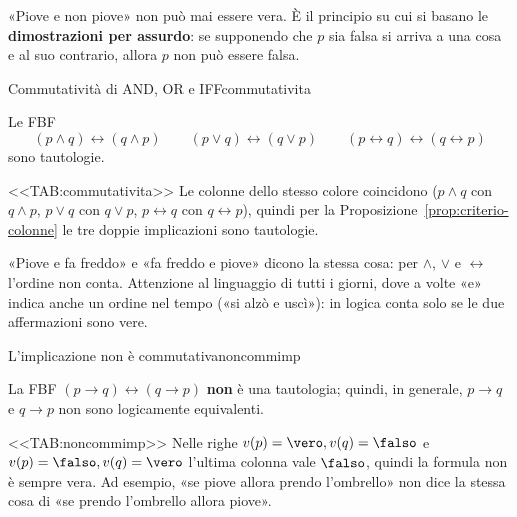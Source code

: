 \begin{spiegazione}
    «Piove e non piove» non può mai essere vera. È il principio su cui si basano le \textbf{dimostrazioni per assurdo}: se supponendo che $p$ sia falsa si
    arriva a una cosa e al suo contrario, allora $p$ non può essere falsa.
\end{spiegazione}


\begin{concetto}
\begin{Proposizione}{Commutatività di AND, OR e IFF}{commutativita}
    \begin{prerequisiti}
    \end{prerequisiti}
    Le FBF
    \[ (p \wedge q) \leftrightarrow (q \wedge p) \qquad (p \vee q) \leftrightarrow (q \vee p) \qquad (p \leftrightarrow q) \leftrightarrow (q \leftrightarrow p) \]
    sono tautologie.
\end{Proposizione}

\begin{dimostrazione}
    <<TAB:commutativita>>
    Le colonne dello stesso colore coincidono ($p \wedge q$ con $q \wedge p$, $p \vee q$ con $q \vee p$,
    $p \leftrightarrow q$ con $q \leftrightarrow p$), quindi per la Proposizione~\ref{prop:criterio-colonne}
    le tre doppie implicazioni sono tautologie.
\end{dimostrazione}
\end{concetto}

\begin{spiegazione}
    «Piove e fa freddo» e «fa freddo e piove» dicono la stessa cosa: per $\wedge$, $\vee$ e $\leftrightarrow$ l'ordine non conta. Attenzione al linguaggio di tutti
    i giorni, dove a volte «e» indica anche un ordine nel tempo («si alzò e uscì»): in logica conta solo se le due affermazioni sono vere.
\end{spiegazione}


\begin{concetto}
\begin{Proposizione}{L'implicazione non è commutativa}{noncommimp}
    \begin{prerequisiti}
    \end{prerequisiti}
    La FBF $(p \rightarrow q) \leftrightarrow (q \rightarrow p)$ \textbf{non} è una tautologia; quindi, in generale,
    $p \rightarrow q$ e $q \rightarrow p$ non sono logicamente equivalenti.
\end{Proposizione}

\begin{dimostrazione}
    <<TAB:noncommimp>>
    Nelle righe $v(p) = \vero, v(q) = \falso$ e $v(p) = \falso, v(q) = \vero$ l'ultima colonna vale $\falso$,
    quindi la formula non è sempre vera. Ad esempio, «se piove allora prendo l'ombrello» non dice la stessa
    cosa di «se prendo l'ombrello allora piove».
\end{dimostrazione}
\end{concetto}

